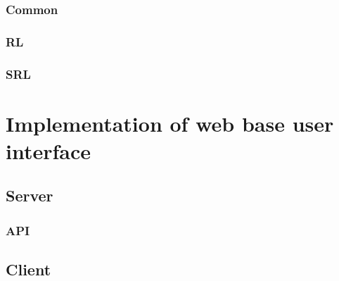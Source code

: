 \subsubsection*{Common}
\subsubsection*{RL}
\subsubsection*{SRL}

\section*{Implementation of web base user interface}
\subsection*{Server}
\subsubsection*{API}
\subsection*{Client}

